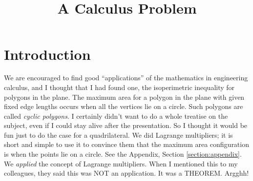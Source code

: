\documentclass[11pt]{article}
\numberwithin{equation}{section}
\numberwithin{figure}{section}
\begin{document}
\title{A Calculus Problem %
}

\maketitle 
 
 




\section{Introduction} \label{section:introduction}

We are encouraged to find good ``applications'' of the mathematics in engineering calculus, and I thought that I had found one, the isoperimetric inequality for polygons in the plane.  The maximum area for a polygon in the plane with given fixed edge lengths occurs when all the vertices lie on a circle.  Such polygons are called \emph{cyclic polygons}. I certainly didn't want to do a whole treatise on the subject, even if I could stay alive after the presentation.  So I thought it would be fun just to do the case for a quadrilateral.  We did Lagrange multipliers; it is short and simple to use it to convince them that the maximum area configuration is when the points lie on a circle. See the Appendix, Section \ref{section:appendix}.  We \emph{applied} the concept of Lagrange multipliers.   When I mentioned this to my colleagues, they said this was NOT an application.  It was a THEOREM.  Argghh!  %
\end{document}
